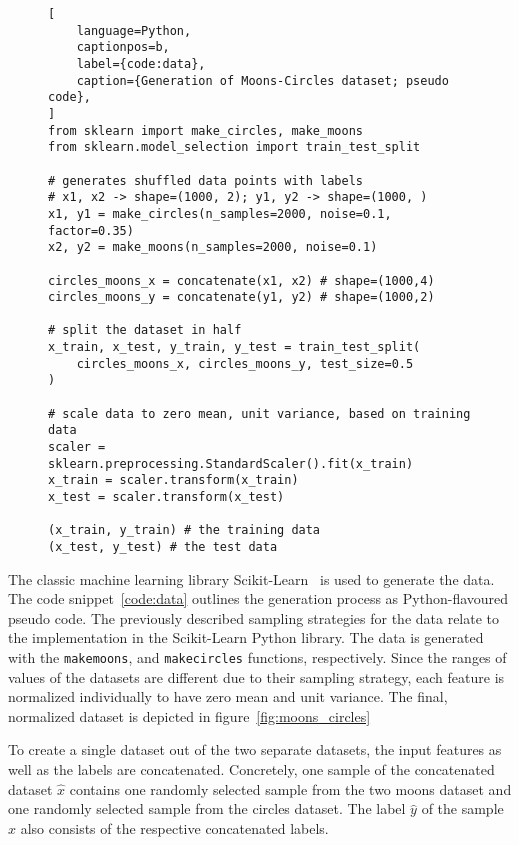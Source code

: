 \begin{figure}[ht]
\centering
\begin{minipage}{\linewidth}
\begin{lstlisting}[
    language=Python,
    captionpos=b, 
    label={code:data},
    caption={Generation of Moons-Circles dataset; pseudo code},
]
from sklearn import make_circles, make_moons
from sklearn.model_selection import train_test_split

# generates shuffled data points with labels
# x1, x2 -> shape=(1000, 2); y1, y2 -> shape=(1000, ) 
x1, y1 = make_circles(n_samples=2000, noise=0.1, factor=0.35)
x2, y2 = make_moons(n_samples=2000, noise=0.1)

circles_moons_x = concatenate(x1, x2) # shape=(1000,4)
circles_moons_y = concatenate(y1, y2) # shape=(1000,2)

# split the dataset in half
x_train, x_test, y_train, y_test = train_test_split(
    circles_moons_x, circles_moons_y, test_size=0.5
)

# scale data to zero mean, unit variance, based on training data
scaler = sklearn.preprocessing.StandardScaler().fit(x_train)
x_train = scaler.transform(x_train)
x_test = scaler.transform(x_test)

(x_train, y_train) # the training data
(x_test, y_test) # the test data
\end{lstlisting}
\end{minipage}
\end{figure}

The classic machine learning library Scikit-Learn~\autocite{sklearn} is used to generate the data. 
The code snippet~\ref{code:data} outlines the generation process as Python-flavoured pseudo code.
The previously described sampling strategies for the data relate to the implementation in the Scikit-Learn Python library.
The data is generated with the \lstinline{makemoons}, and \lstinline{makecircles} functions, respectively.
Since the ranges of values of the datasets are different due to their sampling strategy, each feature is normalized individually to have zero mean and unit variance.
The final, normalized dataset is depicted in figure~\ref{fig:moons_circles}

To create a single dataset out of the two separate datasets, the input features as well as the labels are concatenated.
Concretely, one sample of the concatenated dataset $\hat x$ contains one randomly selected sample from the two moons dataset and one randomly selected sample from the circles dataset.
The label $\hat y$ of the sample $\hat x$ also consists of the respective concatenated labels.

